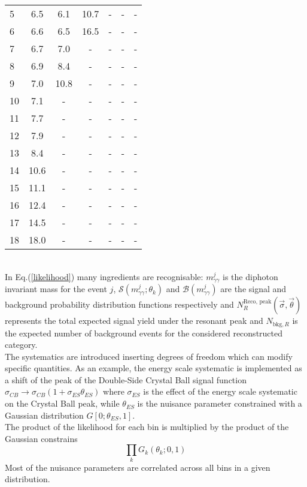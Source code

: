 \begin{table}[h]
\begin{tabular}{l | cccccc}
5 & 6.5 & 6.1 & 10.7 & - & - & - \\
6 & 6.6 & 6.5 & 16.5 & - & - & - \\
7 & 6.7 & 7.0 & - & - & - & - \\
8 & 6.9 & 8.4 & - & - & - & - \\
9 & 7.0 & 10.8 & - & - & - & - \\
10 & 7.1 & - & - & - & - & - \\
11 & 7.7 & - & - & - & - & - \\
12 & 7.9 & - & - & - & - & - \\
13 & 8.4 & - & - & - & - & - \\
14 & 10.6 & - & - & - & - & - \\
15 & 11.1 & - & - & - & - & - \\
16 & 12.4 & - & - & - & - & - \\
17 & 14.5 & - & - & - & - & - \\
18 & 18.0 & - & - & - & - & - \\
\end{tabular}
\end{table}
\\In Eq.(\ref{likelihood}) many ingredients are recognisable: $m_{\gamma\gamma}^j$ is the diphoton invariant mass for the event $j$, $\mathcal{S}(m_{\gamma\gamma}^j; \theta_k)$ and $\mathcal{B}(m_{\gamma\gamma}^j)$ are the signal and background probability distribution functions respectively and $N_R^{\text{Reco, peak}}(\vec{\sigma}, \vec{\theta})$ represents the total expected signal yield under the resonant peak and $N_{\text{bkg}, R}$ is the expected number of background events for the considered reconstructed category.
\\
The systematics are introduced inserting degrees of freedom which can modify specific quantities. As an example, the energy scale systematic is implemented as a shift of the peak of the Double-Side Crystal Ball signal function $\sigma_{CB} \rightarrow \sigma_{CB}(1+\sigma_{ES}\theta_{ES})$ where $\sigma_{ES}$ is the effect of the energy scale systematic on the Crystal Ball peak, while $\theta_{ES}$ is the nuisance parameter constrained with a Gaussian distribution $G[0;\theta_{ES}, 1]$.
\\
The product of the likelihood for each bin is multiplied by the product of the Gaussian constrains
\begin{equation}
\prod_{k} G_k(\theta_k; 0, 1)
\end{equation}
Most of the nuisance parameters are correlated across all bins in a given distribution.
